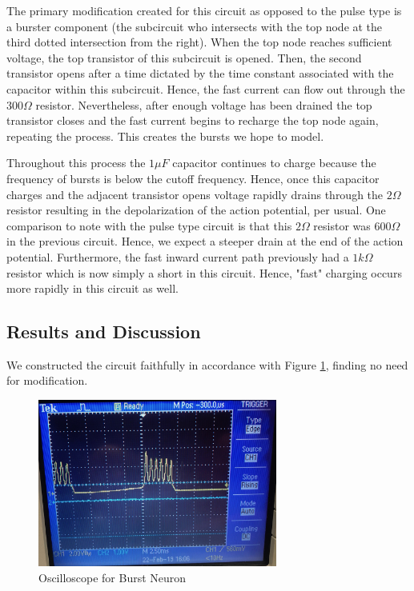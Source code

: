 \documentclass[12]{book}
\newcommand\0{\mathbf{0}}
\newcommand\<{\langle}
\renewcommand\>{\rangle}
\begin{document}
The primary modification created for this circuit as opposed to the pulse type is a burster component (the subcircuit who intersects with the top node at the third dotted intersection from the right). When the top node reaches sufficient voltage, the top transistor of this subcircuit is opened. Then, the second transistor opens after a time dictated by the time constant associated with the capacitor within this subcircuit. Hence, the fast current can flow out through the $300 \Omega$ resistor. Nevertheless, after enough voltage has been drained the top transistor closes and the fast current begins to recharge the top node again, repeating the process. This creates the bursts we hope to model.

Throughout this process the $1 \mu F$ capacitor continues to charge because the frequency of bursts is below the cutoff frequency. Hence, once this capacitor charges and the adjacent transistor opens voltage rapidly drains through the $2 \Omega$ resistor resulting in the depolarization of the action potential, per usual. One comparison to note with the pulse type circuit is that this $2 \Omega$ resistor was $600 \Omega$ in the previous circuit. Hence, we expect a steeper drain at the end of the action potential. Furthermore, the fast inward current path previously had a $1k \Omega$ resistor which is now simply a short in this circuit. Hence, "fast" charging occurs more rapidly in this circuit as well.

\subsection{Results and Discussion}

We constructed the circuit faithfully in accordance with Figure \ref{fig:maeda-burst}, finding no need for modification.

\begin{figure}[H]
\label{fig:maeda-burst}
\centering
\includegraphics[width=0.7\textwidth]{burster_osc}
\caption{Oscilloscope for Burst Neuron}
\end{figure}
\end{document}
